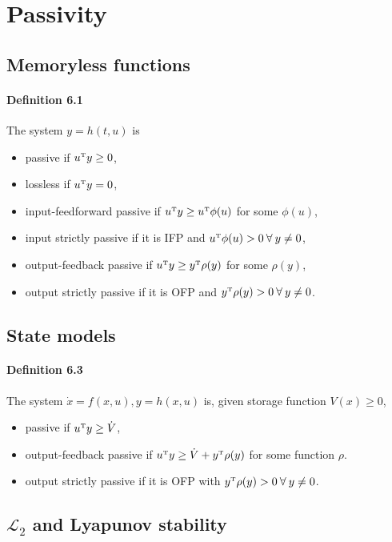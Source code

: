 \section{Passivity}

\subsection{Memoryless functions}
\paragraph{Definition 6.1}
The system $y = h(t,u)$ is
\begin{itemize}
	\item passive if $u^{\scriptscriptstyle \mathrm{T}} y \geq 0$,
	\item lossless if $u^{\scriptscriptstyle \mathrm{T}} y = 0$,
	\item input-feedforward passive if $u^{\scriptscriptstyle \mathrm{T}} y \geq u^{\scriptscriptstyle \mathrm{T}} \phi(u)$ for some $\phi(u)$,
	\item input strictly passive if it is IFP and $u^{\scriptscriptstyle \mathrm{T}} \phi(u) > 0 \: \forall \: y \neq 0$,
	\item output-feedback passive if $u^{\scriptscriptstyle \mathrm{T}} y \geq y^{\scriptscriptstyle \mathrm{T}} \rho(y)$ for some $\rho(y)$,
	\item output strictly passive if it is OFP and $y^{\scriptscriptstyle \mathrm{T}} \rho(y) > 0 \: \forall \: y \neq 0$.
\end{itemize}

\subsection{State models}
\paragraph{Definition 6.3}
The system $\dot{x} = f(x,u), y = h(x,u)$ is, given storage function $V(x) \geq 0$,
\begin{itemize}
	\item passive if $u^{\scriptscriptstyle \mathrm{T}} y \geq \dot{V}$,
	\item output-feedback passive if $u^{\scriptscriptstyle \mathrm{T}} y \geq \dot{V} + y^{\scriptscriptstyle \mathrm{T}} \rho(y)$ for some function $\rho$.
	\item output strictly passive if it is OFP with $y^{\scriptscriptstyle \mathrm{T}} \rho(y) > 0 \: \forall \: y \neq 0$.
\end{itemize}

\subsection[\texorpdfstring{$\mathcal{L}_2$ and Lyapunov stability}
	{L2 and Lyapunov stability}]
	{$\mathcal{L}_2$ and Lyapunov stability}
